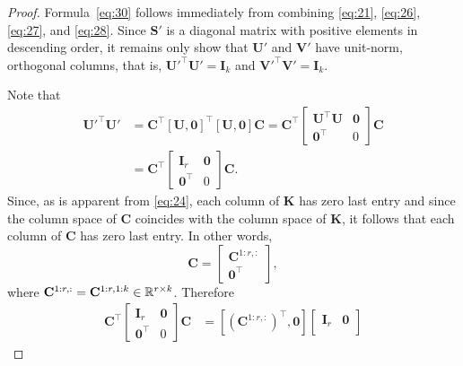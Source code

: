 \documentclass[11pt,a4paper]{article}
\theoremstyle{break}
\numberwithin{dummy}{section}
\theoremstyle{plain}
\theoremstyle{plain}
\theoremstyle{plain}
\theoremstyle{plain}
\theoremstyle{plain}
\theoremstyle{MyNonumberplain}
\newtheorem{proof}{Proof}
\newcommand{\0}{\M{0}}
\newcommand{\M}[1]{\mathbf{#1}}
\newcommand{\R}{\mathbb{R}}
\newcommand{\T}{\top}
\newcommand{\Mat}[2]{%
  \ifthenelse{\equal{#2}{1}}
  {\R^{#1}}
  {\R^{#1 \times #2}}
}
\begin{document}
\begin{proof}
  Formula~\eqref{eq:30} follows immediately from combining \eqref{eq:21}, \eqref{eq:26}, \eqref{eq:27}, and \eqref{eq:28}.  Since $\M{S}'$ is a diagonal matrix with positive elements in descending order, it remains only show that $\M{U}'$ and $\M{V}' $ have unit-norm, orthogonal columns, that is,
  \begin{math}
    \M{U}'^\T \M{U}' = \M{I}_k
  \end{math}
  and
  \begin{math}
    \M{V}'^\T \M{V}' = \M{I}_k.
  \end{math}
  
  Note that
  \begin{equation}
    \label{eq:31}
    \begin{split}
      \M{U}'^\T \M{U}' & = \M{C}^\T [\M{U}, \0]^\T [\M{U}, \0] \M{C}
      = \M{C}^\T
      \begin{bmatrix}
        \M{U}^\T \M{U} & \0 \\
        \0^\T & 0
      \end{bmatrix}
      \M{C}
      \\
      & = \M{C}^\T
      \begin{bmatrix}
        \M{I}_r & \0\\
        \0^\T & 0
      \end{bmatrix}
      \M{C}.
    \end{split}
  \end{equation}
  Since, as is apparent from \eqref{eq:24}, each column of $\M{K}$ has zero last entry and since the column space of $\M{C}$ coincides with the column space of $\M{K}$, it follows that each column of $\M{C}$ has zero last entry. In other words,
  \begin{equation}
    \label{eq:32}
  \M{C} =
  \begin{bmatrix}
    \M{C}^{1:r, :}
    \\
    \0^\T
  \end{bmatrix},
\end{equation}
where $\M{C}^{1:r, :} = \M{C}^{1:r,1:k} \in \Mat{r}{k}$.  Therefore
  \begin{align*}
    \M{C}^\T
    \begin{bmatrix}
      \M{I}_r & \0 \\
      \0^\T & 0
    \end{bmatrix}
             \M{C} & =
                     [(\M{C}^{1:r, :})^\T, \0]
                     \begin{bmatrix}
                       \M{I}_r & \0 \\

\end{bmatrix}
\end{align*}
\end{proof}
\end{document}
